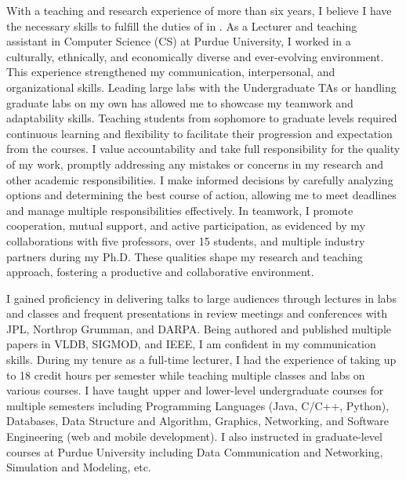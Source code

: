 \documentclass[10pt]{article}
\renewcommand*\paragraph[1]{}
\begin{document}
\paragraph{2 and 3) Demonstrated ability to teach and interact with both undergraduate and graduate students}
With a teaching and research 
experience of more than six years, I believe I have the necessary skills to fulfill the duties of  \PositionName{} in  \ifx\DepartmentName\undefined \SchoolName \else \DepartmentName \fi.
As a Lecturer and teaching assistant in Computer Science (CS) at Purdue University, I worked in a culturally, ethnically, and economically diverse and ever-evolving environment. This experience strengthened my communication, interpersonal, and organizational skills. Leading large labs with the Undergraduate TAs or handling graduate labs on my own has allowed me to showcase my teamwork and adaptability skills. Teaching students from sophomore to graduate levels required continuous learning and flexibility to facilitate their progression and expectation from the courses. I value accountability and take full responsibility for the quality of my work, promptly addressing any mistakes or concerns in my research and other academic responsibilities. I make informed decisions by carefully analyzing options and determining the best course of action, allowing me to meet deadlines and manage multiple responsibilities effectively. In teamwork, I promote cooperation, mutual support, and active participation, as evidenced by my collaborations with five professors, over 15 students, and multiple industry partners during my Ph.D. These qualities shape my research and teaching approach, fostering a productive and collaborative environment.

\paragraph{4) Good communication skills.}
I gained proficiency in delivering talks to large audiences through lectures in labs and classes and frequent presentations in review meetings and conferences with JPL, Northrop Grumman, and DARPA. Being authored and published multiple papers in VLDB, SIGMOD, and IEEE, I am confident in my communication skills. During my tenure as a full-time lecturer, I had the experience of taking up to 18 credit hours per semester while teaching multiple classes and 
labs on various courses. I have taught upper and lower-level undergraduate courses for multiple semesters including Programming Languages (Java, C/C++, Python), Databases, Data Structure and Algorithm, Graphics, Networking, and Software Engineering (web and mobile development). I also instructed in graduate-level courses at Purdue University including Data Communication and Networking, Simulation and Modeling, etc.
\end{document}
